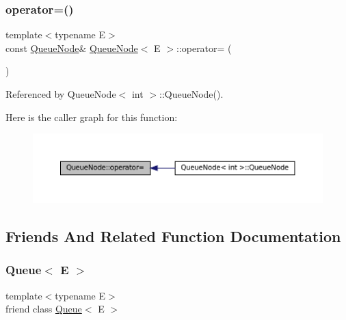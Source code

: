 \subsubsection{\texorpdfstring{operator=()}{operator=()}}
{\footnotesize\ttfamily template$<$typename E$>$ \\
const \hyperlink{classQueueNode}{Queue\+Node}\& \hyperlink{classQueueNode}{Queue\+Node}$<$ E $>$\+::operator= (\begin{DoxyParamCaption}\item[{const \hyperlink{classQueueNode}{Queue\+Node}$<$ E $>$ \&}]{ }\end{DoxyParamCaption})\hspace{0.3cm}{\ttfamily [private]}}



Referenced by Queue\+Node$<$ int $>$\+::\+Queue\+Node().

Here is the caller graph for this function\+:
\nopagebreak
\begin{figure}[H]
\begin{center}
\leavevmode
\includegraphics[width=350pt]{classQueueNode_a8635bbe6310e011ef4fcf1a01566dbb7_icgraph}
\end{center}
\end{figure}


\subsection{Friends And Related Function Documentation}
\mbox{\label{classQueueNode_ad4336229b1d7c3626e4ba69f236b202d}} 
\subsubsection{\texorpdfstring{Queue$<$ E $>$}{Queue< E >}}
{\footnotesize\ttfamily template$<$typename E$>$ \\
friend class \hyperlink{classQueue}{Queue}$<$ E $>$\hspace{0.3cm}{\ttfamily [friend]}}



